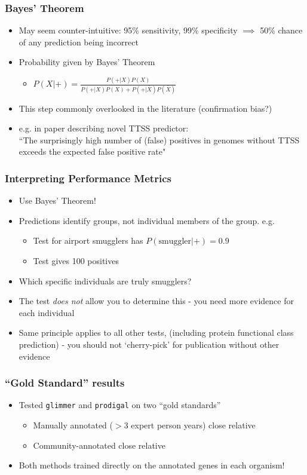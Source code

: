 \begin{frame}
  \frametitle{Bayes' Theorem}
  \begin{itemize}
    \item May seem counter-intuitive: 95\% sensitivity, 99\% specificity $\implies$ 50\% chance of any prediction being incorrect
    \item Probability given by Bayes' Theorem
    \begin{itemize}
      \item $P(X|+) =  \frac{P(+|X) P(X)}{P(+|X) P(X) + P(+|\bar{X}) P(\bar{X})}$
    \end{itemize}
    \item This step commonly overlooked in the literature (confirmation bias?)
    \item e.g. in paper describing novel TTSS predictor: \\
      ``The surprisingly high number of (false) positives in genomes without TTSS exceeds the expected false positive rate"
  \end{itemize} 
\end{frame}

\begin{frame}
  \frametitle{Interpreting Performance Metrics}
  \begin{itemize}
    \item<1-> Use Bayes' Theorem!
    \item<1-> Predictions identify groups, not individual members of the group. e.g.
    \begin{itemize}
      \item Test for airport smugglers has $P(\text{smuggler}|+) = 0.9$
      \item Test gives 100 positives
    \end{itemize}
    \item<1-> Which specific individuals are truly smugglers?
    \item<2-> The test \emph{does not} allow you to determine this - you need more evidence for each individual
    \item<2->  Same principle applies to all other tests, (including protein functional class prediction) - you should not `cherry-pick' for publication without other evidence
  \end{itemize} 
\end{frame}

\begin{frame}
  \frametitle{``Gold Standard'' results}
  \begin{itemize}
    \item Tested \texttt{glimmer} and \texttt{prodigal} on two ``gold standards''
    \begin{itemize}
      \item Manually annotated ($>$3 expert person years) close relative
      \item Community-annotated close relative
    \end{itemize}
    \item Both methods trained directly on the annotated genes in each organism!
  \end{itemize} 
\end{frame}

